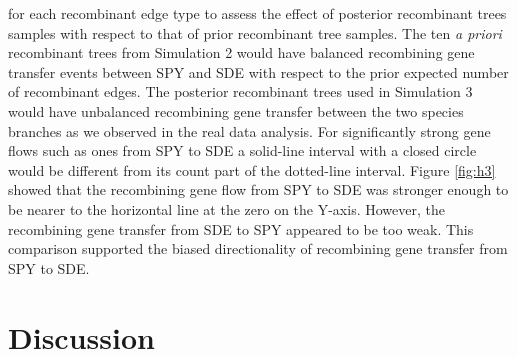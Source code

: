 \documentclass[10pt]{article}
\begin{document}
for each recombinant edge type to assess the effect of posterior recombinant
trees samples with respect to that of prior recombinant tree samples. The ten
\textit{a priori} recombinant trees from Simulation 2 would have balanced
recombining gene transfer events between SPY and SDE with respect to the prior
expected number of recombinant edges. The posterior recombinant trees used in
Simulation 3 would have unbalanced recombining gene transfer between the two
species branches as we observed in the real data analysis. For significantly
strong gene flows such as ones from SPY to SDE a solid-line interval with a
closed circle would be different from its count part of the dotted-line
interval.  Figure \ref{fig:h3} showed that the recombining gene flow from SPY to
SDE was stronger enough to be nearer to the horizontal line at the zero on the
Y-axis. However, the recombining gene transfer from SDE to SPY appeared to be
too weak.  This comparison supported the biased directionality of recombining
gene transfer from SPY to SDE.



\section*{Discussion}
\end{document}
